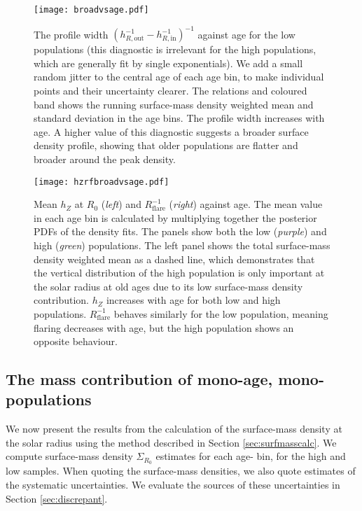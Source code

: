 \begin{figure}
	\texttt{[image: broadvsage.pdf]}
    \caption{The profile width $(h_{R,\mathrm{out}}^{-1} - h_{R,\mathrm{in}}^{-1})^{-1}$ against age for the low \afe{} populations (this diagnostic is irrelevant for the high \afe{} populations, which are generally fit by single exponentials). We add a small random jitter to the central age of each age bin, to make individual points and their uncertainty clearer. The relations and coloured band shows the running surface-mass density weighted mean and standard deviation in the age bins. The profile width increases with age. A higher value of this diagnostic suggests a broader surface density profile, showing that older populations are flatter and broader around the peak density.}
    \label{fig:agevsbroadening}
\end{figure}


\begin{figure*}
	\texttt{[image: hzrfbroadvsage.pdf]}
    \caption{ Mean $h_Z$ at $R_0$ (\emph{left}) and $R_{\mathrm{flare}}^{-1}$ (\emph{right}) against age. The mean value in each age bin is calculated by multiplying together the posterior PDFs of the density fits. The panels show both the low (\emph{purple}) and high (\emph{green}) \afe{} populations. The left panel shows the total surface-mass density weighted mean as a dashed line, which demonstrates that the vertical distribution of the high \afe{} population is only important at the solar radius at old ages due to its low surface-mass density contribution. $h_Z$ increases with age for both low and high \afe{} populations. $R_{\mathrm{flare}}^{-1}$ behaves similarly for the low \afe{} population, meaning flaring decreases with age, but the high \afe{} population shows an opposite behaviour.}
    \label{fig:agevshzrf}
\end{figure*}

\subsection{The mass contribution of mono-age, mono-\feh{} populations}
\label{sec:surfmassdens}
We now present the results from the calculation of the surface-mass density at the solar radius using the method described in Section \ref{sec:surfmasscalc}. We compute surface-mass density $\Sigma_{R_0}$ estimates for each age-\feh{} bin, for the high and low \afe{} samples. When quoting the surface-mass densities, we also quote estimates of the systematic uncertainties. We evaluate the sources of these uncertainties in Section \ref{sec:discrepant}.

